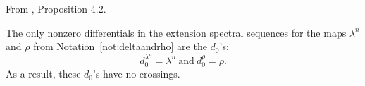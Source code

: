 \begin{proposition}
\label{paper:4.2}
From \cite{LWX126}, Proposition 4.2.\par
\label{prop:9770ae6e} 
The only nonzero differentials in the extension spectral sequences for the maps $\lambda^n$ and $\rho$ from Notation~\ref{not:deltaandrho} are the $d_0$'s:
$$d^{\lambda^n}_0=\lambda^n \ \text{and} \ d^{\rho}_0=\rho.$$ 
As a result, these $d_0$'s have no crossings.


\end{proposition}
